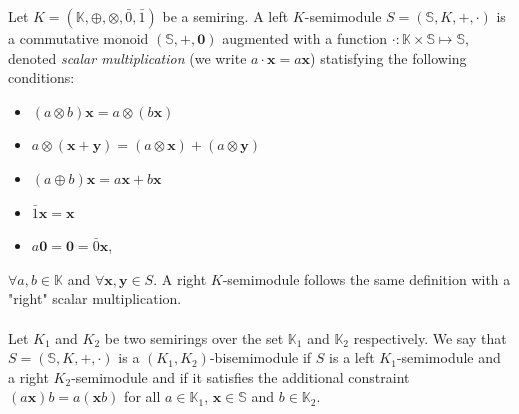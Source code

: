 Let $K = (\mathbb{K}, \oplus, \otimes, \bar{0}, \bar{1})$ be a semiring. A left $K$-semimodule \cite{Golan1999_2} $S = (\mathbb{S}, K, +, \cdot)$ is a commutative monoid $(
\mathbb{S}, +, \mathbf{0})$ augmented with a function $\cdot : \mathbb{K} \times \mathbb{S} \mapsto \mathbb{S}$, denoted \emph{scalar multiplication} (we write $a \cdot \mathbf{x} = a 
\mathbf{x}$) statisfying the following conditions:
\begin{itemize}
    \item $(a \otimes b) \mathbf{x} = a \otimes (b \mathbf{x})$
    \item $a \otimes (\mathbf{x} + \mathbf{y}) = (a \otimes \mathbf{x}) + (a \otimes \mathbf{y}) $
    \item $(a \oplus b) \mathbf{x} = a \mathbf{x} + b \mathbf{x}$
    \item $\bar{1} \mathbf{x} = \mathbf{x}$
    \item $a \mathbf{0} = \mathbf{0} = \bar{0} \mathbf{x}$,
\end{itemize}
$\forall a, b \in \mathbb{K}$ and $\forall \mathbf{x}, \mathbf{y} \in S$. A right $K$-semimodule follows the same definition with a "right" scalar multiplication.

\paragraph{} Let $K_1$ and $K_2$ be two semirings over the set $\mathbb{K}_1$ and $\mathbb{K}_2$ respectively. We say that $S = (\mathbb{S}, K, +, \cdot)$ is a $(K_1, K_2)$-bisemimodule \cite{Golan1999_2} if $S$ is a left $K_1$-semimodule and a right $K_2$-semimodule and if it satisfies the additional constraint $(a \mathbf{x}) b = a (\mathbf{x} b)$ for all $a \in \mathbb{K}_1$, $\mathbf{x} \in \mathbb{S}$ and $b \in \mathbb{K}_2$.

